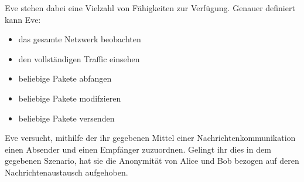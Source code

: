 \newpage
Eve stehen dabei eine Vielzahl von Fähigkeiten zur Verfügung. Genauer definiert kann Eve:
\begin{itemize}
	\item das gesamte Netzwerk beobachten
	\item den vollständigen Traffic einsehen
	\item beliebige Pakete abfangen
	\item beliebige Pakete modifzieren
	\item beliebige Pakete versenden
\end{itemize}

Eve versucht, mithilfe der ihr gegebenen Mittel einer Nachrichtenkommunikation einen Absender und einen Empfänger zuzuordnen. Gelingt ihr dies in dem gegebenen Szenario, hat sie die Anonymität von Alice und Bob bezogen auf deren Nachrichtenaustausch aufgehoben.